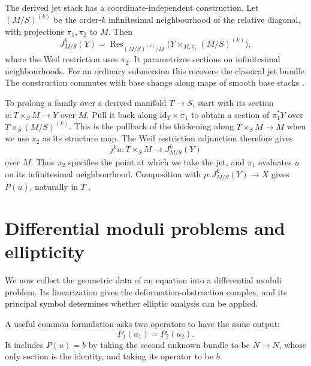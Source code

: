 The derived jet stack has a coordinate-independent construction.
Let $(M/S)^{(k)}$ be the order-$k$ infinitesimal neighbourhood of the
relative diagonal, with projections $\pi_1,\pi_2$ to $M$. Then
\[
 J^k_{M/S}(Y)
 =\operatorname{Res}_{(M/S)^{(k)}/M}
       \bigl(Y\times_{M,\pi_1}(M/S)^{(k)}\bigr),
\]
where the Weil restriction uses $\pi_2$.
It parametrizes sections on infinitesimal neighbourhoods.
For an ordinary submersion this recovers the classical jet bundle.
The construction commutes with base change along maps of smooth base
stacks \cite[Definition~3.3.7 and Proposition~3.3.9(2)]
{Steffens_Representability_Elliptic_Moduli}.

To prolong a family over a derived manifold $T\to S$, start with its
section $u\colon T\times_S M\to Y$ over $M$. Pull it back along
$\mathrm{id}_T\times\pi_1$ to obtain a section of $\pi_1^*Y$ over
$T\times_S(M/S)^{(k)}$. This is the pullback of the thickening along
$T\times_S M\to M$ when we use $\pi_2$ as its structure map.
The Weil restriction adjunction therefore gives
\[
 j^ku\colon T\times_S M\longrightarrow J^k_{M/S}(Y)
\]
over $M$. Thus $\pi_2$ specifies the point at which we take the jet,
and $\pi_1$ evaluates $u$ on its infinitesimal neighbourhood.
Composition with $p\colon J^k_{M/S}(Y)\to X$ gives $P(u)$, naturally
in $T$ \cite[end of Section~3.3]{Steffens_Representability_Elliptic_Moduli}.

\section{Differential moduli problems and ellipticity}

We now collect the geometric data of an equation into a differential
moduli problem. Its linearization gives the deformation-obstruction
complex, and its principal symbol determines whether elliptic analysis
can be applied.

A useful common formulation asks two operators to have the same output:
\[
 P_1(u_1)=P_2(u_2).
\]
It includes $P(u)=b$ by taking the second unknown bundle to be $N\to N$,
whose only section is the identity, and taking its operator to be $b$.



